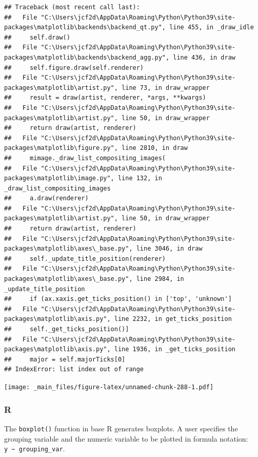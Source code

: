 \documentclass[
]{book}
\begin{document}
\begin{verbatim}
## Traceback (most recent call last):
##   File "C:\Users\jcf2d\AppData\Roaming\Python\Python39\site-packages\matplotlib\backends\backend_qt.py", line 455, in _draw_idle
##     self.draw()
##   File "C:\Users\jcf2d\AppData\Roaming\Python\Python39\site-packages\matplotlib\backends\backend_agg.py", line 436, in draw
##     self.figure.draw(self.renderer)
##   File "C:\Users\jcf2d\AppData\Roaming\Python\Python39\site-packages\matplotlib\artist.py", line 73, in draw_wrapper
##     result = draw(artist, renderer, *args, **kwargs)
##   File "C:\Users\jcf2d\AppData\Roaming\Python\Python39\site-packages\matplotlib\artist.py", line 50, in draw_wrapper
##     return draw(artist, renderer)
##   File "C:\Users\jcf2d\AppData\Roaming\Python\Python39\site-packages\matplotlib\figure.py", line 2810, in draw
##     mimage._draw_list_compositing_images(
##   File "C:\Users\jcf2d\AppData\Roaming\Python\Python39\site-packages\matplotlib\image.py", line 132, in _draw_list_compositing_images
##     a.draw(renderer)
##   File "C:\Users\jcf2d\AppData\Roaming\Python\Python39\site-packages\matplotlib\artist.py", line 50, in draw_wrapper
##     return draw(artist, renderer)
##   File "C:\Users\jcf2d\AppData\Roaming\Python\Python39\site-packages\matplotlib\axes\_base.py", line 3046, in draw
##     self._update_title_position(renderer)
##   File "C:\Users\jcf2d\AppData\Roaming\Python\Python39\site-packages\matplotlib\axes\_base.py", line 2984, in _update_title_position
##     if (ax.xaxis.get_ticks_position() in ['top', 'unknown']
##   File "C:\Users\jcf2d\AppData\Roaming\Python\Python39\site-packages\matplotlib\axis.py", line 2232, in get_ticks_position
##     self._get_ticks_position()]
##   File "C:\Users\jcf2d\AppData\Roaming\Python\Python39\site-packages\matplotlib\axis.py", line 1936, in _get_ticks_position
##     major = self.majorTicks[0]
## IndexError: list index out of range
\end{verbatim}

\texttt{[image: \_main\_files/figure-latex/unnamed-chunk-288-1.pdf]}

\hypertarget{r-45}{%
\subsubsection*{R}\label{r-45}}

The \texttt{boxplot()} function in base R generates boxplots. A user specifies the grouping variable and the numeric variable to be plotted in formula notation: \texttt{y\ \textasciitilde{}\ grouping\_var}.
\end{document}
